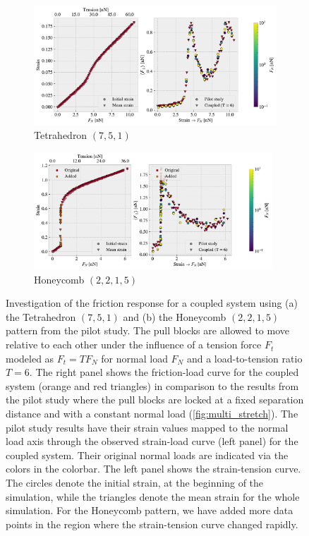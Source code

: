 \begin{figure}[!htb]
  \centering
  \begin{subfigure}[t]{\textwidth}
      \centering
      \includegraphics[width=\textwidth]{figures/negative_coefficient/manual_coupling_tension_pop7_5_1.pdf}
      \caption{Tetrahedron $(7,5,1)$}
  \end{subfigure}
  \begin{subfigure}[t]{\textwidth}
    \centering
    \raggedleft
    \includegraphics[width=0.98\textwidth]{figures/negative_coefficient/manual_coupling_tension_hon2215.pdf}
    \caption{Honeycomb $(2,2,1,5)$}
  \end{subfigure}
  \hfill
  \caption{Investigation of the friction response for a coupled system using (a)
  the Tetrahedron $(7,5,1)$ and (b) the Honeycomb $(2,2,1,5)$ pattern from the
  pilot study. The pull blocks are allowed to move relative to each other under
  the influence of a tension force $F_t$ modeled as $F_t = TF_N$ for normal load
  $F_N$ and a load-to-tension ratio $T=6$. The right panel shows the
  friction-load curve for the coupled system (orange and red triangles) in
  comparison to the results from the pilot study where the pull blocks are
  locked at a fixed separation distance and with a constant normal load
  (\cref{fig:multi_stretch}). The pilot study results have their strain values
  mapped to the normal load axis through the observed strain-load curve (left panel) for the
  coupled system. Their original normal loads are indicated via the colors in
  the colorbar. The left panel shows the strain-tension curve. The circles
  denote the initial strain, at the beginning of the simulation, while the
  triangles denote the mean strain for the whole simulation. For the Honeycomb
  pattern, we have added more data points in the region where the strain-tension
  curve changed rapidly.}
  \label{fig:negfric}
\end{figure}
